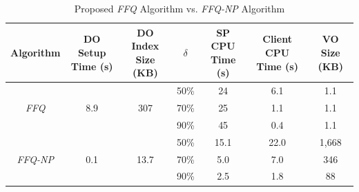 \begin{table}[t]
  \centering
  \footnotesize
    \begin{tabular}{ccccccc}
      \toprule
      Algorithm &
      \tabincell{c}{DO Setup\\Time (s)} & \tabincell{c}{DO Index\\Size (KB)} &
      $\delta$ &
      \tabincell{c}{SP CPU\\Time (s)} & \tabincell{c}{Client CPU\\Time (s)} & \tabincell{c}{VO Size\\(KB)}   \\
      \midrule
      \multirow{3}{*}{\emph{FFQ}} &
      \multirow{3}{*}{8.9} &
      \multirow{3}{*}{307} &
      50\% &
      24 & 6.1 & 1.1 \\
         & & &
      70\% &
      25 & 1.1 & 1.1 \\
         & & &
      90\% &
      45 & 0.4 & 1.1 \\
      \midrule
      \multirow{3}{*}{\emph{FFQ-NP}} &
      \multirow{3}{*}{0.1} &
      \multirow{3}{*}{13.7} &
      50\% &
      15.1 & 22.0 & 1,668 \\
           & & &
      70\% &
      5.0 & 7.0 & 346 \\
          & & &
      90\% &
      2.5 & 1.8 & 88 \\
      \bottomrule
  \end{tabular}
  \caption{Proposed \emph{FFQ} Algorithm vs. \emph{FFQ-NP} Algorithm}\label{tab:aggregate-queries:baseline}
\end{table}

